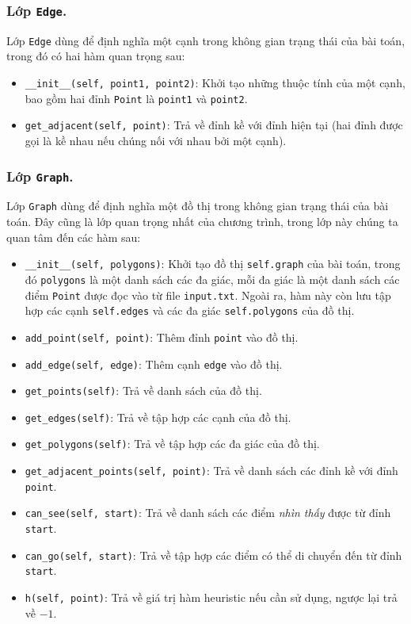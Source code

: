 \documentclass[a4paper, 11pt]{article}
\begin{document}
\subsubsection{Lớp \lstinline|Edge|.}
Lớp \lstinline|Edge| dùng để định nghĩa một cạnh trong không gian trạng thái của bài toán, trong đó có hai hàm quan trọng sau:
\begin{itemize}
  \item \lstinline|__init__(self, point1, point2)|: Khởi tạo những thuộc tính của một cạnh, bao gồm hai đỉnh \lstinline|Point| là \lstinline|point1| và \lstinline|point2|.
  \item \lstinline|get_adjacent(self, point)|: Trả về đỉnh kề với đỉnh hiện tại (hai đỉnh được gọi là kề nhau nếu chúng nối với nhau bởi một cạnh).
\end{itemize}

\subsubsection{Lớp \lstinline|Graph|.}
Lớp \lstinline|Graph| dùng để định nghĩa một đồ thị trong không gian trạng thái của bài toán. Đây cũng là lớp quan trọng nhất của chương trình, trong lớp này chúng ta quan tâm đến các hàm sau:

\begin{itemize}
  \item \lstinline|__init__(self, polygons)|: Khởi tạo đồ thị \lstinline|self.graph| của bài toán, trong đó \lstinline|polygons| là một danh sách các đa giác, mỗi đa giác là một danh sách các điểm \lstinline|Point| được đọc vào từ file \lstinline|input.txt|. Ngoài ra, hàm này còn lưu tập hợp các cạnh \lstinline|self.edges| và các đa giác \lstinline|self.polygons| của đồ thị.
  \item \lstinline|add_point(self, point)|: Thêm đỉnh \lstinline|point| vào đồ thị.
  \item \lstinline|add_edge(self, edge)|: Thêm cạnh \lstinline|edge| vào đồ thị.
  \item \lstinline|get_points(self)|: Trả về danh sách của đồ thị.
  \item \lstinline|get_edges(self)|: Trả về tập hợp các cạnh của đồ thị.
  \item \lstinline|get_polygons(self)|: Trả về tập hợp các đa giác của đồ thị.
  \item \lstinline|get_adjacent_points(self, point)|: Trả về danh sách các đỉnh kề với đỉnh \lstinline|point|.
  \item \lstinline|can_see(self, start)|: Trả về danh sách các điểm \textit{nhìn thấy} được từ đỉnh \lstinline|start|.
  \item \lstinline|can_go(self, start)|: Trả về tập hợp các điểm có thể di chuyển đến từ đỉnh \lstinline|start|.
  \item \lstinline|h(self, point)|: Trả về giá trị hàm heuristic nếu cần sử dụng, ngược lại trả về $-1$.
\end{itemize}
\end{document}
